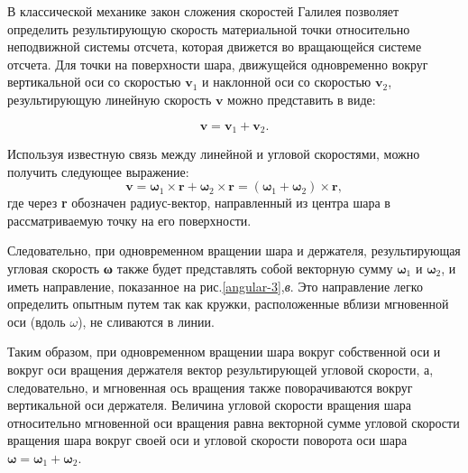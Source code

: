 \documentclass[14pt,a4paper,twoside]{extarticle}	%
\begin{document}
В классической механике закон сложения скоростей Галилея позволяет определить результирующую скорость материальной точки относительно неподвижной системы отсчета, которая движется во вращающейся системе отсчета. Для точки на поверхности шара, движущейся одновременно вокруг вертикальной оси со скоростью $\textbf{v}_1$ и наклонной оси со скоростью $\textbf{v}_2$, результирующую линейную скорость $\textbf{v}$ можно представить в виде:

\begin{equation}\label{angular-eq1}
\textbf{v} = \textbf{v}_1 + \textbf{v}_2.
\end{equation}

Используя известную связь между линейной и угловой скоростями, можно получить следующее выражение:
\begin{equation}\label{angular-eq2}
\textbf{v} = \textbf{ω}_1 \times \textbf{r} + \textbf{ω}_2 \times \textbf{r} = (\textbf{ω}_1 + \textbf{ω}_2) \times \textbf{r} ,
\end{equation}
где через \textbf{r} обозначен радиус-вектор, направленный из центра шара в рассматриваемую точку на его поверхности.

Следовательно, при одновременном вращении шара и держателя, результирующая угловая скорость  \textbf{ω} также будет представлять собой векторную сумму $ \textbf{ω}_1 $ и $ \textbf{ω}_2 $, и иметь направление, показанное на рис.\ref{angular-3},\textit{в}.
Это направление легко определить опытным путем так как кружки, расположенные вблизи мгновенной оси (вдоль $ \omega $), не сливаются в линии.

Таким образом, при одновременном вращении шара вокруг собственной оси и вокруг оси вращения держателя вектор результирующей угловой скорости, а, следовательно, и мгновенная ось вращения также поворачиваются вокруг вертикальной оси держателя. Величина угловой скорости вращения шара относительно мгновенной оси вращения равна векторной сумме угловой скорости вращения шара вокруг своей оси и угловой скорости поворота оси шара $ \textbf{ω} = \textbf{ω}_1 + \textbf{ω}_2 $.
\end{document}
